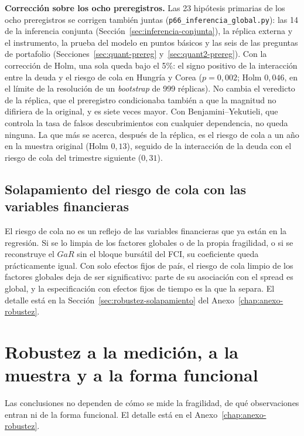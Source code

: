 \textbf{Corrección sobre los ocho preregistros.} Las 23 hipótesis primarias de los ocho preregistros se corrigen también juntas (\texttt{p66\_inferencia\_global.py}): las 14 de la inferencia conjunta (Sección~\ref{sec:inferencia-conjunta}), la réplica externa y el instrumento, la prueba del modelo en puntos básicos y las seis de las preguntas de portafolio (Secciones~\ref{sec:quant-prereg} y~\ref{sec:quant2-prereg}). Con la corrección de Holm, una sola queda bajo el 5\%: el signo positivo de la interacción entre la deuda y el riesgo de cola en Hungría y Corea ($p=0{,}002$; Holm $0{,}046$, en el límite de la resolución de un \textit{bootstrap} de 999 réplicas). No cambia el veredicto de la réplica, que el preregistro condicionaba también a que la magnitud no difiriera de la original, y es siete veces mayor. Con Benjamini--Yekutieli, que controla la tasa de falsos descubrimientos con cualquier dependencia, no queda ninguna. La que más se acerca, después de la réplica, es el riesgo de cola a un año en la muestra original (Holm $0{,}13$), seguido de la interacción de la deuda con el riesgo de cola del trimestre siguiente ($0{,}31$).

\subsection{Solapamiento del riesgo de cola con las variables financieras}

El riesgo de cola no es un reflejo de las variables financieras que ya están en la regresión. Si se lo limpia de los factores globales o de la propia fragilidad, o si se reconstruye el $GaR$ sin el bloque bursátil del FCI, su coeficiente queda prácticamente igual. Con solo efectos fijos de país, el riesgo de cola limpio de los factores globales deja de ser significativo: parte de su asociación con el spread es global, y la especificación con efectos fijos de tiempo es la que la separa. El detalle está en la Sección~\ref{sec:robustez-solapamiento} del Anexo~\ref{chap:anexo-robustez}.

\section{Robustez a la medición, a la muestra y a la forma funcional}
\label{sec:robustez-resumen}

Las conclusiones no dependen de cómo se mide la fragilidad, de qué observaciones entran ni de la forma funcional. El detalle está en el Anexo~\ref{chap:anexo-robustez}.

